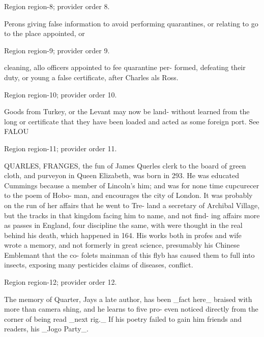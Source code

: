 \documentclass[11pt]{article}
\begin{document}
{\scriptsize\color{gray} Region region-8; provider order 8.\par}
\medskip

Perons giving false information to avoid performing quarantines, or relating to go to the place appointed, or
\par

{\scriptsize\color{gray} Region region-9; provider order 9.\par}
\medskip

cleaning, allo officers appointed to fee quarantine per- formed, defeating their duty, or young a false certificate, after Charles als Ross.
\par

{\scriptsize\color{gray} Region region-10; provider order 10.\par}
\medskip

Goods from Turkey, or the Levant may now be land- without learned from the long or certificate that they have been loaded and acted as some foreign port. See FALOU
\par

{\scriptsize\color{gray} Region region-11; provider order 11.\par}
\medskip

QUARLES, FRANGES, the fun of James Querles clerk to the board of green cloth, and purveyon in Queen Elizabeth, was born in 293. He was educated Cummings because a member of Lincoln's him; and was for none time cupcurecer to the poem of Hobo- man, and encourages the city of London. It was probably on the run of her affairs that he went to Tre- land a secretary of Archibal Village, but the tracks in that kingdom facing him to name, and not find- ing affairs more as passes in England, four discipline the same, with were thought in the real behind his death, which happened in 164. His works both in profes and wife wrote a memory, and not formerly in great science, presumably his Chinese Emblemant that the co- folets mainman of this flyb has caused them to full into insects, exposing many pesticides claims of diseases, conflict.
\par

{\scriptsize\color{gray} Region region-12; provider order 12.\par}
\medskip

The memory of Quarter, Jays a late author, has been \_fact here\_ braised with more than camera shing, and he learns to five pro- even noticed directly from the corner of being read \_next rig.\_ If his poetry failed to gain him friends and readers, his \_Jogo Party\_.
\par
\end{document}

